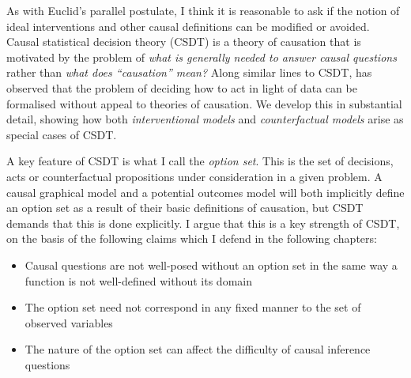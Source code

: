 As with Euclid's parallel postulate, I think it is reasonable to ask if the notion of ideal interventions and other causal definitions can be modified or avoided. Causal statistical decision theory (CSDT) is a theory of causation that is motivated by the problem of \emph{what is generally needed to answer causal questions} rather than \emph{what does ``causation'' mean?} Along similar lines to CSDT, \citet{dawid_decision-theoretic_2020} has observed that the problem of deciding how to act in light of data can be formalised without appeal to theories of causation. We develop this in substantial detail, showing how both \emph{interventional models} and \emph{counterfactual models} arise as special cases of CSDT.

A key feature of CSDT is what I call the \emph{option set}. This is the set of decisions, acts or counterfactual propositions under consideration in a given problem. A causal graphical model and a potential outcomes model will both implicitly define an option set as a result of their basic definitions of causation, but CSDT demands that this is done explicitly. I argue that this is a key strength of CSDT, on the basis of the following claims which I defend in the following chapters:

\begin{itemize}
    \item Causal questions are not well-posed without an option set in the same way a function is not well-defined without its domain
    \item The option set need not correspond in any fixed manner to the set of observed variables
    \item The nature of the option set can affect the difficulty of causal inference questions
\end{itemize}






